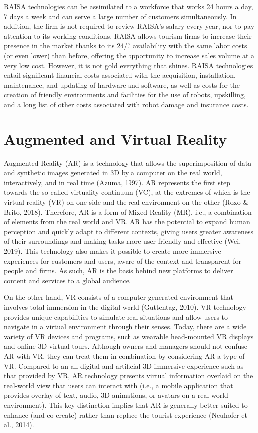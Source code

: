 \documentclass[
  letterpaper,
  DIV=11,
  numbers=noendperiod]{scrreprt}
\begin{document}
RAISA technologies can be assimilated to a workforce that works 24 hours
a day, 7 days a week and can serve a large number of customers
simultaneously. In addition, the firm is not required to review RAISA's
salary every year, nor to pay attention to its working conditions. RAISA
allows tourism firms to increase their presence in the market thanks to
its 24/7 availability with the same labor costs (or even lower) than
before, offering the opportunity to increase sales volume at a very low
cost. However, it is not gold everything that shines. RAISA technologies
entail significant financial costs associated with the acquisition,
installation, maintenance, and updating of hardware and software, as
well as costs for the creation of friendly environments and facilities
for the use of robots, upskilling, and a long list of other costs
associated with robot damage and insurance costs.

\hypertarget{augmented-and-virtual-reality}{%
\section{Augmented and Virtual
Reality}\label{augmented-and-virtual-reality}}

Augmented Reality (AR) is a technology that allows the superimposition
of data and synthetic images generated in 3D by a computer on the real
world, interactively, and in real time (Azuma, 1997). AR represents the
first step towards the so-called virtuality continuum (VC), at the
extremes of which is the virtual reality (VR) on one side and the real
environment on the other (Roxo \& Brito, 2018). Therefore, AR is a form
of Mixed Reality (MR), i.e., a combination of elements from the real
world and VR. AR has the potential to expand human perception and
quickly adapt to different contexts, giving users greater awareness of
their surroundings and making tasks more user-friendly and effective
(Wei, 2019). This technology also makes it possible to create more
immersive experiences for customers and users, aware of the context and
transparent for people and firms. As such, AR is the basis behind new
platforms to deliver content and services to a global audience.

On the other hand, VR consists of a computer-generated environment that
involves total immersion in the digital world (Guttentag, 2010). VR
technology provides unique capabilities to simulate real situations and
allow users to navigate in a virtual environment through their senses.
Today, there are a wide variety of VR devices and programs, such as
wearable head-mounted VR displays and online 3D virtual tours. Although
owners and managers should not confuse AR with VR, they can treat them
in combination by considering AR a type of VR. Compared to an
all-digital and artificial 3D immersive experience such as that provided
by VR, AR technology presents virtual information overlaid on the
real-world view that users can interact with (i.e., a mobile application
that provides overlay of text, audio, 3D animations, or avatars on a
real-world environment). This key distinction implies that AR is
generally better suited to enhance (and co-create) rather than replace
the tourist experience (Neuhofer et al., 2014).
\end{document}
